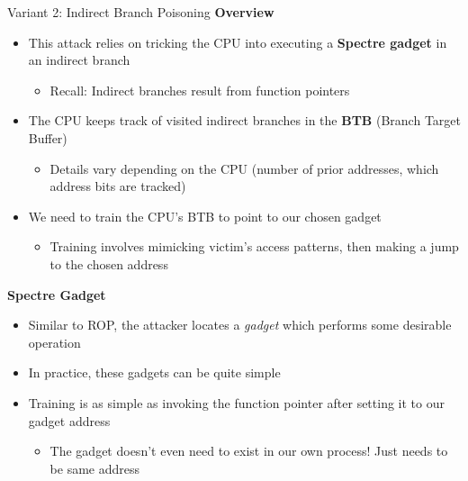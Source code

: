 \documentclass[10pt, dvipsnames, aspectratio=169]{beamer}
\begin{document}
\begin{frame}[c,fragile]{Variant 2: Indirect Branch Poisoning}{}
  {\bf Overview}
  \begin{itemize}
    \item This attack relies on tricking the CPU into executing a {\bf Spectre gadget} in an indirect branch
    \begin{itemize}
      \item Recall: Indirect branches result from function pointers
    \end{itemize}
    \item The CPU keeps track of visited indirect branches in the {\bf BTB} (Branch Target Buffer)
    \begin{itemize}
      \item Details vary depending on the CPU (number of prior addresses, which address bits are tracked)
    \end{itemize}
    \item We need to train the CPU's BTB to point to our chosen gadget
    \begin{itemize}
      \item Training involves mimicking victim's access patterns, then making a jump to the chosen address
    \end{itemize}
  \end{itemize}

  \vfill
  {\bf Spectre Gadget}
  \begin{itemize}
    \item Similar to ROP, the attacker locates a \textit{gadget} which performs some desirable operation
    \item In practice, these gadgets can be quite simple
    \item Training is as simple as invoking the function pointer after setting it to our gadget address
    \begin{itemize}
      \item The gadget doesn't even need to exist in our own process! Just needs to be same address
    \end{itemize}
  \end{itemize}
\end{frame}
\end{document}
